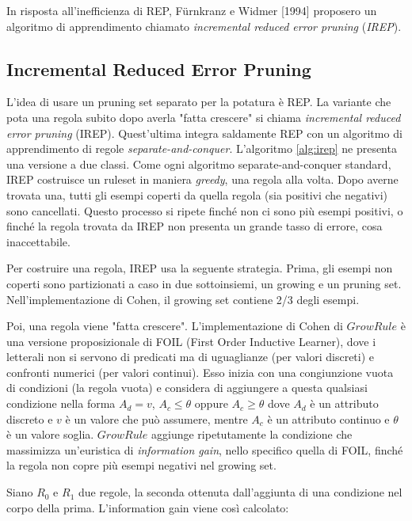 In risposta all'inefficienza di REP, Fürnkranz e Widmer [1994] proposero un algoritmo di apprendimento chiamato \textit{incremental reduced error pruning} (\textit{IREP})\cite{Furnkranz94incrementalreduced}.

\subsection{Incremental Reduced Error Pruning}
L'idea di usare un pruning set separato per la potatura è REP. La variante che pota una regola subito dopo averla "fatta crescere" si chiama \textit{incremental reduced error pruning} (IREP)\cite{2Witten:2011:DMP:1972514}. Quest'ultima integra saldamente REP con un algoritmo di apprendimento di regole \textit{separate-and-conquer}. L'algoritmo \ref{alg:irep} ne presenta una versione a due classi. Come ogni algoritmo separate-and-conquer standard, IREP costruisce un ruleset in maniera \textit{greedy}, una regola alla volta. Dopo averne trovata una, tutti gli esempi coperti da quella regola (sia positivi che negativi) sono cancellati. Questo processo si ripete finché non ci sono più esempi positivi, o finché la regola trovata da IREP non presenta un grande tasso di errore, cosa inaccettabile.

Per costruire una regola, IREP usa la seguente strategia. Prima, gli esempi non coperti sono partizionati a caso in due sottoinsiemi, un growing e un pruning set. Nell'implementazione di Cohen, il growing set contiene 2/3 degli esempi.

Poi, una regola viene "fatta crescere". L'implementazione di Cohen di $GrowRule$ è una versione proposizionale di FOIL (First Order Inductive Learner), dove i letterali non si servono di predicati ma di uguaglianze (per valori discreti) e confronti numerici (per valori continui)\cite{Russell:2003:AIM:773294}. Esso inizia con una congiunzione vuota di condizioni (la regola vuota) e considera di aggiungere a questa qualsiasi condizione nella forma $A_d=v$, $A_c \leq \theta$ oppure $A_c \geq \theta$ dove $A_d$ è un attributo discreto e $v$ è un valore che può assumere, mentre $A_c$ è un attributo continuo e $\theta$ è un valore soglia. $GrowRule$ aggiunge ripetutamente la condizione che massimizza un'euristica di \emph{information gain}, nello specifico quella di FOIL, finché la regola non copre più esempi negativi nel growing set.

Siano $R_0$ e $R_1$ due regole, la seconda ottenuta dall'aggiunta di una condizione nel corpo della prima. L'information gain viene così calcolato:

